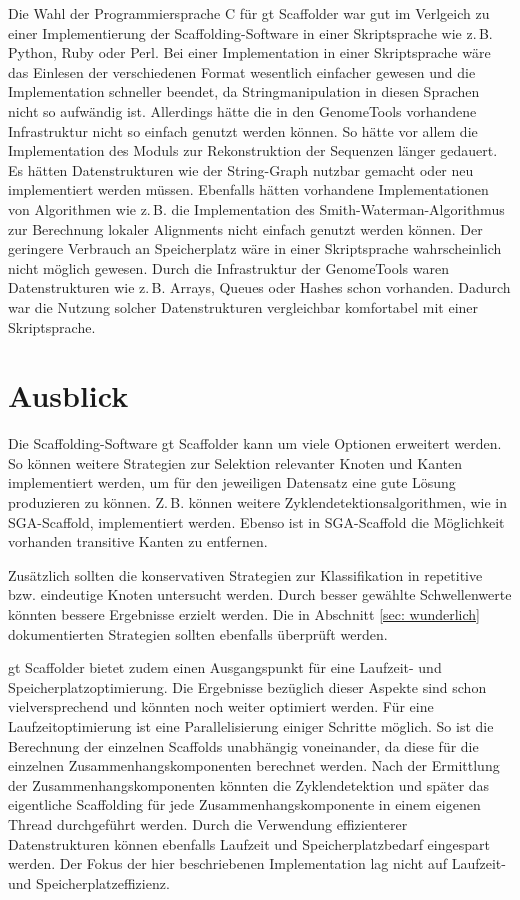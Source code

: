 \documentclass[a4paper,10pt,parskip]{scrartcl}
\begin{document}
Die Wahl der Programmiersprache C für gt Scaffolder war gut im
Verlgeich zu einer Implementierung der Scaffolding-Software in einer
Skriptsprache wie z.\,B. Python, Ruby oder Perl. Bei einer
Implementation in einer Skriptsprache wäre das Einlesen der
verschiedenen Format wesentlich einfacher gewesen und die
Implementation schneller beendet, da Stringmanipulation in diesen
Sprachen nicht so aufwändig ist. Allerdings hätte die in den
GenomeTools vorhandene Infrastruktur nicht so einfach genutzt werden
können. So hätte vor allem die Implementation des Moduls zur
Rekonstruktion der Sequenzen länger gedauert. Es hätten
Datenstrukturen wie der String-Graph nutzbar gemacht oder neu
implementiert werden müssen. Ebenfalls hätten vorhandene
Implementationen von Algorithmen wie z.\,B. die Implementation des
Smith-Waterman-Algorithmus zur Berechnung lokaler Alignments nicht
einfach genutzt werden können. Der geringere Verbrauch an
Speicherplatz wäre in einer Skriptsprache wahrscheinlich nicht möglich
gewesen. Durch die Infrastruktur der GenomeTools waren Datenstrukturen
wie z.\,B. Arrays, Queues oder Hashes schon vorhanden. Dadurch war die
Nutzung solcher Datenstrukturen vergleichbar komfortabel mit einer
Skriptsprache.

\section{Ausblick}
\label{sec: Ausblick}

Die Scaffolding-Software gt Scaffolder kann um viele Optionen
erweitert werden. So können weitere Strategien zur Selektion
relevanter Knoten und Kanten implementiert werden, um für den
jeweiligen Datensatz eine gute Lösung produzieren zu
können. Z.\,B. können weitere Zyklendetektionsalgorithmen, wie in
SGA-Scaffold, implementiert werden. Ebenso ist in SGA-Scaffold die
Möglichkeit vorhanden transitive Kanten zu entfernen.

Zusätzlich sollten die konservativen Strategien zur Klassifikation in
repetitive bzw. eindeutige Knoten untersucht werden. Durch besser
gewählte Schwellenwerte könnten bessere Ergebnisse erzielt werden. Die
in Abschnitt \ref{sec: wunderlich} dokumentierten Strategien sollten
ebenfalls überprüft werden.

gt Scaffolder bietet zudem einen Ausgangspunkt für eine Laufzeit- und
Speicherplatzoptimierung. Die Ergebnisse bezüglich dieser Aspekte sind
schon vielversprechend und könnten noch weiter optimiert werden. Für
eine Laufzeitoptimierung ist eine Parallelisierung einiger Schritte
möglich. So ist die Berechnung der einzelnen Scaffolds unabhängig
voneinander, da diese für die einzelnen Zusammenhangskomponenten
berechnet werden. Nach der Ermittlung der Zusammenhangskomponenten
könnten die Zyklendetektion und später das eigentliche Scaffolding für
jede Zusammenhangskomponente in einem eigenen Thread durchgeführt
werden. Durch die Verwendung effizienterer Datenstrukturen können
ebenfalls Laufzeit und Speicherplatzbedarf eingespart werden. Der
Fokus der hier beschriebenen Implementation lag nicht auf Laufzeit-
und Speicherplatzeffizienz.
\end{document}
